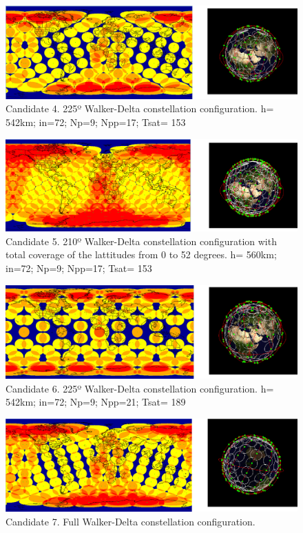 \begin{figure}[H] %
	\centering
	\includegraphics[width=1\textwidth]{Candidate4.png}
	\caption[Candidate 4. 225º Walker-Delta constellation configuration]{Candidate 4. 225º Walker-Delta constellation configuration.
			 h= 542km; in=72; Np=9; Npp=17; Tsat= 153}
	\label{fig:Candidate4}
\end{figure}

\begin{figure}[H] %
	\centering
	\includegraphics[width=1\textwidth]{Candidate5.png}
	\caption[Candidate 5. 210º Walker-Delta constellation configuration with total coverage of the lattitudes from 0 to 52 degrees]{Candidate 5. 210º Walker-Delta constellation configuration with total coverage of the lattitudes from 0 to 52 degrees.
			 h= 560km; in=72; Np=9; Npp=17; Tsat= 153} 
	\label{fig:Candidate5}
\end{figure}

\begin{figure}[H] %
	\centering
	\includegraphics[width=1\textwidth]{Candidate6.png}
	\caption[Candidate 6. 225º Walker-Delta constellation configuration]{Candidate 6. 225º Walker-Delta constellation configuration.
			 h= 542km; in=72; Np=9; Npp=21; Tsat= 189}
	\label{fig:Candidate6}
\end{figure}

\begin{figure}[H] %
	\centering
	\includegraphics[width=1\textwidth]{Candidate7.png}
	\caption[Candidate 7. Full Walker-Delta constellation configuration]{Candidate 7. Full Walker-Delta constellation configuration.}
	\label{fig:Candidate7}
\end{figure}


